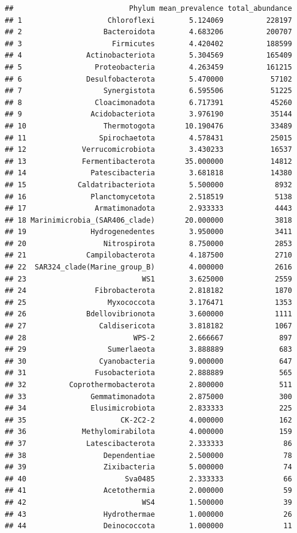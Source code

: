 \documentclass[
]{book}
\begin{document}
\begin{verbatim}
##                           Phylum mean_prevalence total_abundance
## 1                    Chloroflexi        5.124069          228197
## 2                   Bacteroidota        4.683206          200707
## 3                     Firmicutes        4.420402          188599
## 4               Actinobacteriota        5.304569          165409
## 5                 Proteobacteria        4.263459          161215
## 6               Desulfobacterota        5.470000           57102
## 7                   Synergistota        6.595506           51225
## 8                 Cloacimonadota        6.717391           45260
## 9                Acidobacteriota        3.976190           35144
## 10                  Thermotogota       10.190476           33489
## 11                 Spirochaetota        4.578431           25015
## 12             Verrucomicrobiota        3.430233           16537
## 13             Fermentibacterota       35.000000           14812
## 14               Patescibacteria        3.681818           14380
## 15            Caldatribacteriota        5.500000            8932
## 16               Planctomycetota        2.518519            5138
## 17                Armatimonadota        2.933333            4443
## 18 Marinimicrobia_(SAR406_clade)       20.000000            3818
## 19               Hydrogenedentes        3.950000            3411
## 20                  Nitrospirota        8.750000            2853
## 21              Campilobacterota        4.187500            2710
## 22  SAR324_clade(Marine_group_B)        4.000000            2616
## 23                           WS1        3.625000            2559
## 24                Fibrobacterota        2.818182            1870
## 25                   Myxococcota        3.176471            1353
## 26              Bdellovibrionota        3.600000            1111
## 27                 Caldisericota        3.818182            1067
## 28                         WPS-2        2.666667             897
## 29                   Sumerlaeota        3.888889             683
## 30                 Cyanobacteria        9.000000             647
## 31                Fusobacteriota        2.888889             565
## 32          Coprothermobacterota        2.800000             511
## 33               Gemmatimonadota        2.875000             300
## 34               Elusimicrobiota        2.833333             225
## 35                      CK-2C2-2        4.000000             162
## 36             Methylomirabilota        4.000000             159
## 37              Latescibacterota        2.333333              86
## 38                  Dependentiae        2.500000              78
## 39                  Zixibacteria        5.000000              74
## 40                       Sva0485        2.333333              66
## 41                  Acetothermia        2.000000              59
## 42                           WS4        1.500000              39
## 43                  Hydrothermae        1.000000              26
## 44                  Deinococcota        1.000000              11
\end{verbatim}
\end{document}
